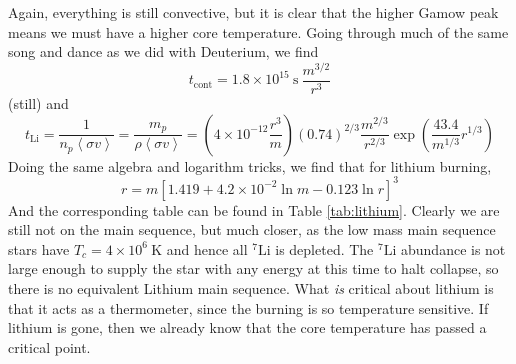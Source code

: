 \documentclass[10pt]{article}
\numberwithin{equation}{section}
\newcommand{\n}{\noindent}
\newcommand{\avg}[1]{\left\langle#1\right\rangle}
\begin{document}
  \n Again, everything is still convective, but it is clear that the
  higher Gamow peak means we must have a higher core
  temperature. Going through much of the same song and dance as we did
  with Deuterium, we find
  \begin{equation}
    \label{eq:401}
    t_{\mathrm{cont}}=1.8\times 10^{15}\ \mathrm{s}\ \frac{m^{3/2}}{r^3}
  \end{equation}
  (still) and 
  \begin{equation}
    \label{eq:402}
    t_{\mathrm{Li}}=\frac{1}{n_p\avg{\sigma
          v}}=\frac{m_p}{\rho\avg{\sigma v}}=\left(4\times
          10^{-12}\frac{r^3}{m}\right)(0.74)^{2/3}\frac{m^{2/3}}{r^{2/3}}\exp
					\left(\frac{43.4}{m^{1/3}}r^{1/3}\right)
  \end{equation}
  Doing the same algebra and logarithm tricks, we find that for
  lithium burning,
  \begin{equation}
    \label{eq:403}
    r=m\left[1.419+4.2\times 10^{-2}\ln m-0.123 \ln r\right]^3
  \end{equation}
  And the corresponding table can be found in Table
  \ref{tab:lithium}. Clearly we are still not on the main sequence,
  but much closer, as the low mass main sequence stars have
  $T_c=4\times 10^6\ \mathrm{K}$ and hence all ${}^7\mathrm{Li}$ is
  depleted. The ${}^7\mathrm{Li}$ abundance is not large enough to
  supply the star with any energy  at this time to halt collapse, so
  there is no equivalent Lithium main sequence. What \emph{is}
  critical about lithium is that it acts as a thermometer, since the
  burning is so temperature sensitive. If lithium is gone, then we
  already know that the core temperature has passed a critical point.
\end{document}
